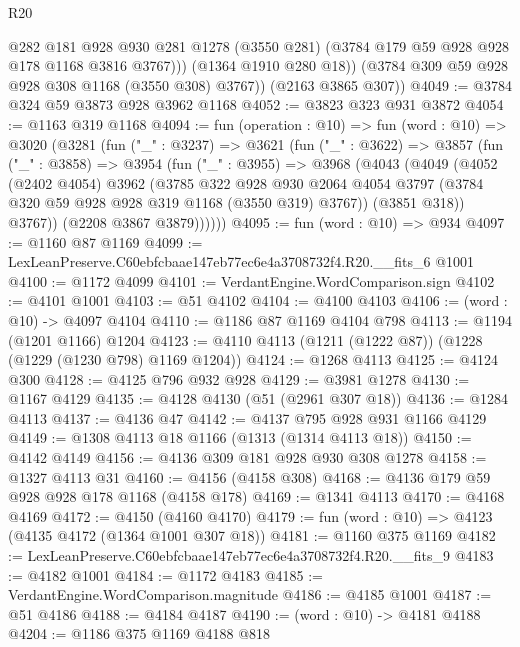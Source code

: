 \begin{lexlean}{R20}
\begin{coremodule}
              @282
              @181
              @928
              @930
              @281
              @1278
              (@3550 @281)
              (@3784 @179 @59 @928 @928 @178 @1168 @3816 @3767)))
          (@1364 @1910 @280 @18))
        (@3784 @309 @59 @928 @928 @308 @1168 (@3550 @308) @3767))
      (@2163 @3865 @307))
@4049 := @3784 @324 @59 @3873 @928 @3962 @1168
@4052 := @3823 @323 @931 @3872
@4054 := @1163 @319 @1168
@4094 := fun (operation : @10) =>
  fun (word : @10) =>
  @3020
    (@3281
      (fun ("_" : @3237) =>
      @3621
        (fun ("_" : @3622) =>
        @3857
          (fun ("_" : @3858) =>
          @3954
            (fun ("_" : @3955) =>
            @3968
              (@4043
                (@4049
                  (@4052
                    (@2402 @4054)
                    @3962
                    (@3785
                      @322
                      @928
                      @930
                      @2064
                      @4054
                      @3797
                      (@3784 @320 @59 @928 @928 @319 @1168 (@3550 @319) @3767))
                    (@3851 @318))
                  @3767))
              (@2208 @3867 @3879))))))
@4095 := fun (word : @10) => @934
@4097 := @1160 @87 @1169
@4099 := LexLeanPreserve.C60ebfcbaae147eb77ec6e4a3708732f4.R20.__fits_6 @1001
@4100 := @1172 @4099
@4101 := VerdantEngine.WordComparison.sign
@4102 := @4101 @1001
@4103 := @51 @4102
@4104 := @4100 @4103
@4106 := (word : @10) -> @4097 @4104
@4110 := @1186 @87 @1169 @4104 @798
@4113 := @1194 (@1201 @1166) @1204
@4123 := @4110 @4113 (@1211 (@1222 @87)) (@1228 (@1229 (@1230 @798) @1169 @1204))
@4124 := @1268 @4113
@4125 := @4124 @300
@4128 := @4125 @796 @932 @928
@4129 := @3981 @1278
@4130 := @1167 @4129
@4135 := @4128 @4130 (@51 (@2961 @307 @18))
@4136 := @1284 @4113
@4137 := @4136 @47
@4142 := @4137 @795 @928 @931 @1166 @4129
@4149 := @1308 @4113 @18 @1166 (@1313 (@1314 @4113 @18))
@4150 := @4142 @4149
@4156 := @4136 @309 @181 @928 @930 @308 @1278
@4158 := @1327 @4113 @31
@4160 := @4156 (@4158 @308)
@4168 := @4136 @179 @59 @928 @928 @178 @1168 (@4158 @178)
@4169 := @1341 @4113
@4170 := @4168 @4169
@4172 := @4150 (@4160 @4170)
@4179 := fun (word : @10) => @4123 (@4135 @4172 (@1364 @1001 @307 @18))
@4181 := @1160 @375 @1169
@4182 := LexLeanPreserve.C60ebfcbaae147eb77ec6e4a3708732f4.R20.__fits_9
@4183 := @4182 @1001
@4184 := @1172 @4183
@4185 := VerdantEngine.WordComparison.magnitude
@4186 := @4185 @1001
@4187 := @51 @4186
@4188 := @4184 @4187
@4190 := (word : @10) -> @4181 @4188
@4204 := @1186
    @375
    @1169
    @4188
    @818

\end{coremodule}
\end{lexlean}
